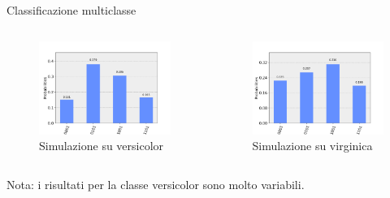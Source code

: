 \documentclass{beamer}
\begin{document}
    \begin{frame}{Classificazione multiclasse}
        \begin{columns}
            \begin{figure}[h]
                \centering
                \includegraphics[width=\linewidth]{gfx/multiclass_versicolor}
                \caption{Simulazione su versicolor}
                \label{}
            \end{figure}
            \begin{figure}[h]
                \centering
                \includegraphics[width=\linewidth]{gfx/multiclass_virginica}
                \caption{Simulazione su virginica}
                \label{}
            \end{figure}
        \end{columns}
        Nota: i risultati per la classe versicolor sono molto variabili. 
    \end{frame}
\end{document}
